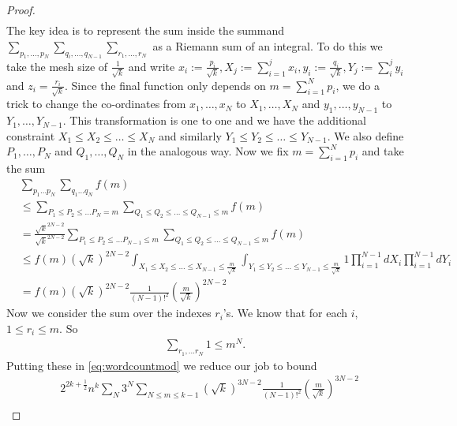 \documentclass[12pt]{article}
\numberwithin{equation}{section}
\numberwithin{equation}{section}
\theoremstyle{definition}
\renewcommand{\1}{\bf 1}
\begin{document}
\begin{proof}
\begin{equation}
\begin{split}
\end{split}
\end{equation}
The key idea is to represent the sum inside the summand $\sum_{p_{1},\ldots,p_{N}}\sum_{q_{i},\ldots,q_{N-1}}\sum_{r_{1},\ldots,r_{N}}$ as a Riemann sum of an integral. To do this we take the mesh size of $\frac{1}{\sqrt{k}}$ and write $x_{i}:=\frac{p_{i}}{\sqrt{k}}, X_{j}:=\sum_{i=1}^{j}x_{i}, y_{i}:= \frac{q_{i}}{\sqrt{k}}, Y_{j}:= \sum_{i}^{j}y_{i}$ and $z_{i}= \frac{r_{i}}{\sqrt{k}}$. Since the final function only depends on $m= \sum_{i=1}^{N}p_{i}$, we do a trick to change the co-ordinates from $x_{1},\ldots, x_{N}$ to $X_{1},\ldots, X_{N}$ and $y_{1},\ldots, y_{N-1}$ to $Y_{1},\ldots, Y_{N-1}$. This transformation is one to one and we have the additional constraint $X_{1}\le X_{2}\le \ldots \le X_{N} $ and similarly $Y_{1}\le Y_{2}\le \ldots \le Y_{N-1}.$ We also define $P_{1},\ldots,P_{N}$ and $Q_{1},\ldots,Q_{N}$ in the analogous way. Now we fix $m= \sum_{i=1}^{N}p_{i}$ and take the sum 
\begin{equation}
\begin{split}
&\sum_{p_{1}\ldots p_{N}} \sum_{q_{1}\ldots q_{N}} f(m)\\
&\le \sum_{P_{1}\le P_{2}\le \ldots P_{N}=m} \sum_{Q_{1}\le Q_{2}\le \ldots \le Q_{N-1}\le m} f(m)\\
&= \frac{\sqrt{k}^{2N-2}}{\sqrt{k}^{2N-2}}\sum_{P_{1}\le P_{2}\le \ldots P_{N-1}\le m} \sum_{Q_{1}\le Q_{2}\le \ldots \le Q_{N-1}\le m} f(m)\\
& \le f(m)\left(\sqrt{k}\right)^{2N-2} \int_{X_{1}\le X_{2}\le \ldots \le X_{N-1}\le \frac{m}{\sqrt{k}}} \int_{Y_{1}\le Y_{2}\le \ldots \le Y_{N-1}\le \frac{m}{\sqrt{k}}} 1\prod_{i=1}^{N-1}dX_{i} \prod_{i=1}^{N-1}dY_{i}\\
&= f(m) \left(\sqrt{k}\right)^{2N-2} \frac{1}{(N-1)!^2}\left(\frac{m}{\sqrt{k}}\right)^{2N-2} 
\end{split}
\end{equation}
Now we consider the sum over the indexes $r_{i}$'s. We know that for each $i$, $1 \le r_{i} \le m$. So 
\begin{equation}
\begin{split}
\sum_{r_{1}, \ldots r_{N}} 1 \le  m^{N}. 
\end{split}
\end{equation} 
Putting these in \eqref{eq:wordcountmod} we reduce our job to bound
\begin{equation}\label{eq:firstintegralrep}
\begin{split}
&2^{2k+\frac{1}{2}}n^{k}\sum_{N}3^{N} \sum_{N\le m \le k-1}\left(\sqrt{k}\right)^{3N-2} \frac{1}{(N-1)!^2}\left(\frac{m}{\sqrt{k}}\right)^{3N-2} \\

\end{split}
\end{equation}
\end{proof}
\end{document}
